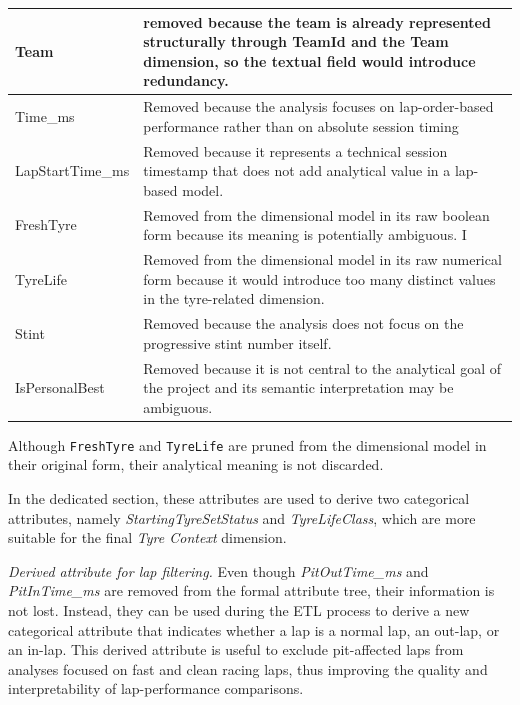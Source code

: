 \documentclass[a4paper,11pt]{article}
\begin{document}
\begin{longtable}{|p{4.4cm}|p{10.8cm}|}
		Team & removed because the team is already represented structurally through TeamId and the Team dimension, so the textual field would introduce redundancy. \\ \hline
		
				
		Time\_ms & Removed because the analysis focuses on lap-order-based performance rather than on absolute session timing \\ \hline
		
		LapStartTime\_ms & Removed because it represents a technical session timestamp that does not add analytical value in a lap-based model. \\ \hline
		
		FreshTyre
		& Removed from the dimensional model in its raw boolean form because its meaning is potentially ambiguous. I \\
		\hline
		
		TyreLife
		& Removed from the dimensional model in its raw numerical form because it would introduce too many distinct values in the tyre-related dimension. \\
		\hline
		
		Stint
		& Removed because the analysis does not focus on the progressive stint number itself. \\
		\hline
		
		IsPersonalBest
		& Removed because it is not central to the analytical goal of the project and its semantic interpretation may be ambiguous. \\
		\hline
	\end{longtable}

	Although \texttt{FreshTyre} and \texttt{TyreLife} are pruned from the dimensional model
	in their original form, their analytical meaning is not discarded.
	
	In the dedicated section, these attributes are used to derive two categorical attributes,
	namely \textit{StartingTyreSetStatus} and \textit{TyreLifeClass}, which are more suitable
	for the final \textit{Tyre Context} dimension.

	\textit{Derived attribute for lap filtering.}
	Even though \textit{PitOutTime\_ms} and \textit{PitInTime\_ms} are removed from the formal attribute tree, their information is not lost.
	Instead, they can be used during the ETL process to derive a new categorical attribute that indicates whether a lap is a normal lap, an out-lap, or an in-lap.
	This derived attribute is useful to exclude pit-affected laps from analyses focused on fast and clean racing laps, thus improving the quality and interpretability of lap-performance comparisons.
		
\end{document}
